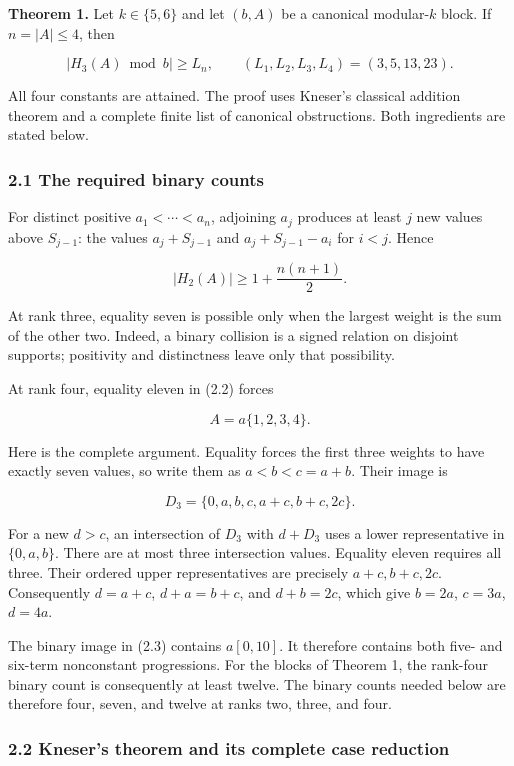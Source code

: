 \documentclass[11pt,a4paper]{article}
\begin{document}
\textbf{Theorem 1.} Let \(k\in\{5,6\}\) and let \((b,A)\) be a canonical modular-\(k\) block. If \(n=|A|\le4\), then

\[
\boxed{|H_3(A)\bmod b|\ge L_n,\qquad
(L_1,L_2,L_3,L_4)=(3,5,13,23).}
\tag{2.1}
\]

All four constants are attained. The proof uses Kneser's classical addition theorem and a complete finite list of canonical obstructions. Both ingredients are stated below.

\subsubsection{2.1 The required binary counts}\label{eporig:the-required-binary-counts}

For distinct positive \(a_1<\cdots<a_n\), adjoining \(a_j\) produces at least \(j\) new values above \(S_{j-1}\): the values \(a_j+S_{j-1}\) and \(a_j+S_{j-1}-a_i\) for \(i<j\). Hence

\[
|H_2(A)|\ge1+\frac{n(n+1)}2.
\tag{2.2}
\]

At rank three, equality seven is possible only when the largest weight is the sum of the other two. Indeed, a binary collision is a signed relation on disjoint supports; positivity and distinctness leave only that possibility.

At rank four, equality eleven in (2.2) forces

\[
A=a\{1,2,3,4\}.
\tag{2.3}
\]

Here is the complete argument. Equality forces the first three weights to have exactly seven values, so write them as \(a<b<c=a+b\). Their image is

\[
D_3=\{0,a,b,c,a+c,b+c,2c\}.
\]

For a new \(d>c\), an intersection of \(D_3\) with \(d+D_3\) uses a lower representative in \(\{0,a,b\}\). There are at most three intersection values. Equality eleven requires all three. Their ordered upper representatives are precisely \(a+c,b+c,2c\). Consequently \(d=a+c\), \(d+a=b+c\), and \(d+b=2c\), which give \(b=2a\), \(c=3a\), \(d=4a\).

The binary image in (2.3) contains \(a[0,10]\). It therefore contains both five- and six-term nonconstant progressions. For the blocks of Theorem 1, the rank-four binary count is consequently at least twelve. The binary counts needed below are therefore four, seven, and twelve at ranks two, three, and four.

\subsubsection{2.2 Kneser's theorem and its complete case reduction}\label{eporig:knesers-theorem-and-its-complete-case-reduction}
\end{document}
